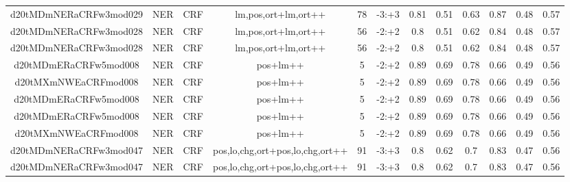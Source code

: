 \documentclass[a4paper]{article}
\begin{document}
\begin{landscape}
\begin{center}
\begin{tabular}{ |c|c|c|c|c|c|c|c|c|c|c|c|}
 	\small{ d20tMDmNERaCRFw3mod029 } & \small{ NER} & \small{  CRF }  & lm,pos,ort+lm,ort++  &  78 &  \small{  -3:+3 }  &  0.81 & 0.51 & 0.63  &  0.87 & 0.48 & 0.57 \\
 	

 
 	
 	\small{ d20tMDmNERaCRFw3mod028 } & \small{ NER} & \small{  CRF }  & lm,pos,ort+lm,ort++  &  56 &  \small{  -2:+2 }  &  0.8 & 0.51 & 0.62  &  0.84 & 0.48 & 0.57 \\
 	

 
 	
 	\small{ d20tMDmNERaCRFw3mod028 } & \small{ NER} & \small{  CRF }  & lm,pos,ort+lm,ort++  &  56 &  \small{  -2:+2 }  &  0.8 & 0.51 & 0.62  &  0.84 & 0.48 & 0.57 \\
 	

 
 	
 	\small{ d20tMDmERaCRFw5mod008 } & \small{ NER} & \small{  CRF }  & pos+lm++  &  5 &  \small{  -2:+2 }  &  0.89 & 0.69 & 0.78  &  0.66 & 0.49 & 0.56 \\
 	

 
 	
 	\small{ d20tMXmNWEaCRFmod008 } & \small{ NER} & \small{  CRF }  & pos+lm++  &  5 &  \small{  -2:+2 }  &  0.89 & 0.69 & 0.78  &  0.66 & 0.49 & 0.56 \\
 	

 
 	
 	\small{ d20tMDmERaCRFw5mod008 } & \small{ NER} & \small{  CRF }  & pos+lm++  &  5 &  \small{  -2:+2 }  &  0.89 & 0.69 & 0.78  &  0.66 & 0.49 & 0.56 \\
 	

 
 	
 	\small{ d20tMDmERaCRFw5mod008 } & \small{ NER} & \small{  CRF }  & pos+lm++  &  5 &  \small{  -2:+2 }  &  0.89 & 0.69 & 0.78  &  0.66 & 0.49 & 0.56 \\
 	

 
 	
 	\small{ d20tMXmNWEaCRFmod008 } & \small{ NER} & \small{  CRF }  & pos+lm++  &  5 &  \small{  -2:+2 }  &  0.89 & 0.69 & 0.78  &  0.66 & 0.49 & 0.56 \\
 	

 
 	
 	\small{ d20tMDmNERaCRFw3mod047 } & \small{ NER} & \small{  CRF }  & pos,lo,chg,ort+pos,lo,chg,ort++  &  91 &  \small{  -3:+3 }  &  0.8 & 0.62 & 0.7  &  0.83 & 0.47 & 0.56 \\
 	

 
 	
 	\small{ d20tMDmNERaCRFw3mod047 } & \small{ NER} & \small{  CRF }  & pos,lo,chg,ort+pos,lo,chg,ort++  &  91 &  \small{  -3:+3 }  &  0.8 & 0.62 & 0.7  &  0.83 & 0.47 & 0.56 \\
 	


\end{tabular}
\end{center}
\end{landscape}
\end{document}
